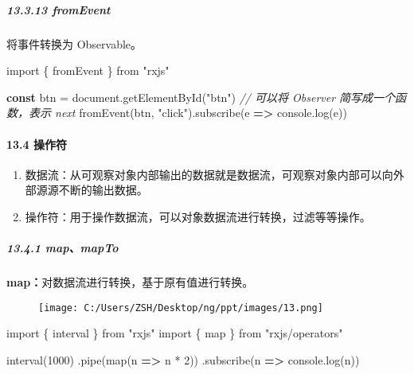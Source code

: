 \documentclass[
]{article}
\newenvironment{Shaded}{}{}
\newcommand{\BuiltInTok}[1]{#1}
\newcommand{\CommentTok}[1]{\textcolor[rgb]{0.38,0.63,0.69}{\textit{#1}}}
\newcommand{\DecValTok}[1]{\textcolor[rgb]{0.25,0.63,0.44}{#1}}
\newcommand{\FunctionTok}[1]{\textcolor[rgb]{0.02,0.16,0.49}{#1}}
\newcommand{\ImportTok}[1]{#1}
\newcommand{\KeywordTok}[1]{\textcolor[rgb]{0.00,0.44,0.13}{\textbf{#1}}}
\newcommand{\NormalTok}[1]{#1}
\newcommand{\OperatorTok}[1]{\textcolor[rgb]{0.40,0.40,0.40}{#1}}
\newcommand{\StringTok}[1]{\textcolor[rgb]{0.25,0.44,0.63}{#1}}
\begin{document}
\hypertarget{13313-fromevent}{%
\subparagraph{13.3.13 fromEvent}\label{13313-fromevent}}

将事件转换为 Observable。

\begin{Shaded}
\begin{Highlighting}[]
\ImportTok{import}\NormalTok{ \{ fromEvent \} }\ImportTok{from} \StringTok{"rxjs"}

\KeywordTok{const}\NormalTok{ btn }\OperatorTok{=} \BuiltInTok{document}\OperatorTok{.}\FunctionTok{getElementById}\NormalTok{(}\StringTok{"btn"}\NormalTok{)}
\CommentTok{// 可以将 Observer 简写成一个函数，表示 next}
\FunctionTok{fromEvent}\NormalTok{(btn}\OperatorTok{,} \StringTok{"click"}\NormalTok{)}\OperatorTok{.}\FunctionTok{subscribe}\NormalTok{(e }\KeywordTok{=\textgreater{}} \BuiltInTok{console}\OperatorTok{.}\FunctionTok{log}\NormalTok{(e))}
\end{Highlighting}
\end{Shaded}

\hypertarget{134-ux64cdux4f5cux7b26}{%
\paragraph{13.4 操作符}\label{134-ux64cdux4f5cux7b26}}

\begin{enumerate}
\def\labelenumi{\arabic{enumi}.}
\item
  数据流：从可观察对象内部输出的数据就是数据流，可观察对象内部可以向外部源源不断的输出数据。
\item
  操作符：用于操作数据流，可以对象数据流进行转换，过滤等等操作。
\end{enumerate}

\hypertarget{1341-mapmapto}{%
\subparagraph{13.4.1 map、mapTo}\label{1341-mapmapto}}

\textbf{map：}对数据流进行转换，基于原有值进行转换。

\begin{figure}
\centering
\texttt{[image: C:/Users/ZSH/Desktop/ng/ppt/images/13.png]}
\caption{}
\end{figure}

\begin{Shaded}
\begin{Highlighting}[]
\ImportTok{import}\NormalTok{ \{ interval \} }\ImportTok{from} \StringTok{"rxjs"}
\ImportTok{import}\NormalTok{ \{ map \} }\ImportTok{from} \StringTok{"rxjs/operators"}

\FunctionTok{interval}\NormalTok{(}\DecValTok{1000}\NormalTok{)}
  \OperatorTok{.}\FunctionTok{pipe}\NormalTok{(}\FunctionTok{map}\NormalTok{(n }\KeywordTok{=\textgreater{}}\NormalTok{ n }\OperatorTok{*} \DecValTok{2}\NormalTok{))}
  \OperatorTok{.}\FunctionTok{subscribe}\NormalTok{(n }\KeywordTok{=\textgreater{}} \BuiltInTok{console}\OperatorTok{.}\FunctionTok{log}\NormalTok{(n))}
\end{Highlighting}
\end{Shaded}
\end{document}
